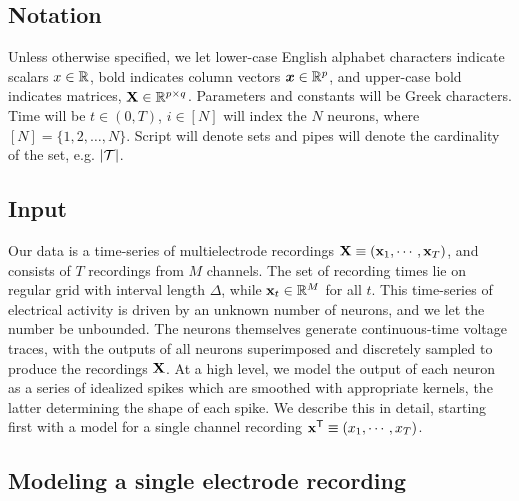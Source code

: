 \newcommand{\bY}{\mathbf{Y}}

\subsection{Notation}

Unless otherwise specified, we let lower-case English alphabet characters indicate scalars $x \in \mathbb{R}$, bold indicates column vectors $\boldsymbol{x} \in \mathbb{R}^p$, and upper-case bold indicates matrices, $\mathbf{X} \in \mathbb{R}^{p \times q}$.  Parameters and constants will be Greek characters.  Time will be $t \in (0,T)$, $i \in [N]$ will index the $N$ neurons, where $[N]=\{1,2,\ldots,N\}$. Script will denote sets and pipes will denote the cardinality of the set, e.g. $|\mathcal{T}|$.  

\subsection{Input}
Our data is a time-series of multielectrode recordings $\mathbf{X} \equiv (\mathbf{x}_1, \cdots, \mathbf{x}_T)$, and consists of $T$ recordings from $M$ channels. 
The set of recording times lie on regular grid with interval length $\Delta$, while $\mathbf{x}_t \in \mathbb{R}^M$ for all $t$. 
This time-series of electrical activity is driven by an unknown number of neurons, and 
we let the number be unbounded. %
The neurons themselves generate continuous-time voltage traces, with the outputs of all neurons superimposed and discretely sampled to produce the 
recordings $\mathbf{X}$.  At a high level, we model the output of each neuron as a
series of idealized spikes which are smoothed with appropriate kernels, the latter determining the shape of each spike. 
We describe this in detail, starting first with a model for a single channel recording $\mathbf{x}^{\mathsf{T}} \equiv (x_1, \cdots, x_T)$.

\subsection{Modeling a single electrode recording}

